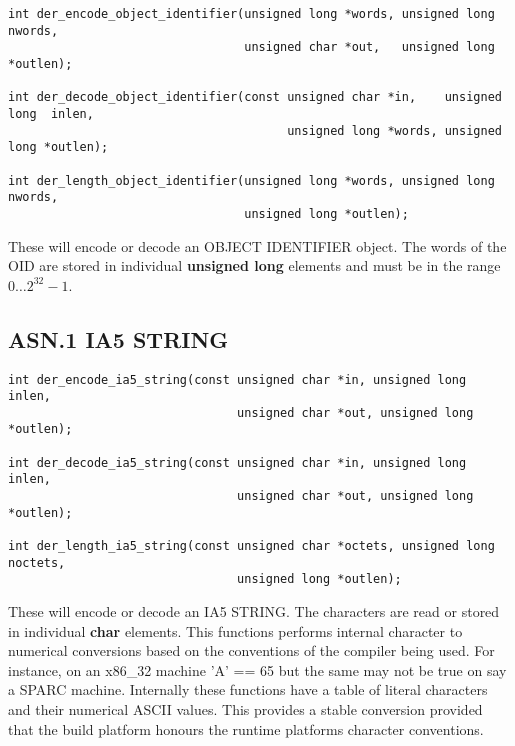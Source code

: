 \documentclass[a4paper]{book}
\begin{document}
\begin{verbatim}
int der_encode_object_identifier(unsigned long *words, unsigned long  nwords,
                                 unsigned char *out,   unsigned long *outlen);

int der_decode_object_identifier(const unsigned char *in,    unsigned long  inlen,
                                       unsigned long *words, unsigned long *outlen);

int der_length_object_identifier(unsigned long *words, unsigned long nwords, 
                                 unsigned long *outlen);
\end{verbatim}

These will encode or decode an OBJECT IDENTIFIER object.  The words of the OID are stored in individual \textbf{unsigned long} elements and must be in the range
$0 \ldots 2^{32} - 1$.  

\subsection{ASN.1 IA5 STRING}

\begin{verbatim}
int der_encode_ia5_string(const unsigned char *in, unsigned long inlen,
                                unsigned char *out, unsigned long *outlen);

int der_decode_ia5_string(const unsigned char *in, unsigned long inlen,
                                unsigned char *out, unsigned long *outlen);

int der_length_ia5_string(const unsigned char *octets, unsigned long noctets, 
                                unsigned long *outlen);
\end{verbatim}

These will encode or decode an IA5 STRING.  The characters are read or stored in individual \textbf{char} elements.  This functions performs internal character
to numerical conversions based on the conventions of the compiler being used.  For instance, on an x86\_32 machine 'A' == 65 but the same may not be true on 
say a SPARC machine.  Internally these functions have a table of literal characters and their numerical ASCII values.  This provides a stable conversion provided
that the build platform honours the runtime platforms character conventions.
\end{document}
